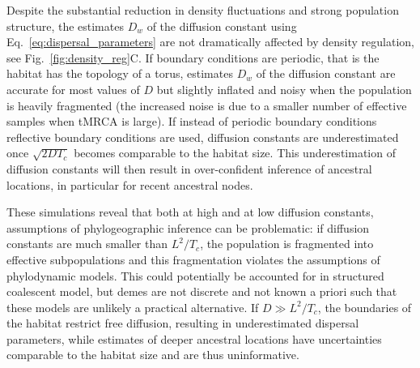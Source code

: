 \documentclass[aps,rmp, twocolumn]{revtex4}
\begin{document}
Despite the substantial reduction in density fluctuations and strong population structure, the estimates $D_w$ of the diffusion constant using Eq.~\ref{eq:dispersal_parameters} are not dramatically affected by density regulation, see Fig.~\ref{fig:density_reg}C.
If boundary conditions are periodic, that is the habitat has the topology of a torus, estimates $D_w$ of the diffusion constant are accurate for most values of $D$ but slightly inflated and noisy  when the population is heavily fragmented (the increased noise is due to a smaller number of effective samples when tMRCA is large).
If instead of periodic boundary conditions reflective boundary conditions are used, diffusion constants are underestimated once $\sqrt{2DT_c}$ becomes comparable to the habitat size.
This underestimation of diffusion constants will then result in over-confident inference of ancestral locations, in particular for recent ancestral nodes.

These simulations reveal that both at high and at low diffusion constants, assumptions of phylogeographic inference can be problematic: if diffusion constants are much smaller than $L^2/T_{c}$, the population is fragmented into effective subpopulations and this fragmentation violates the assumptions of phylodynamic models.
This could potentially be accounted for in structured coalescent model, but demes are not discrete and not known a priori such that these models are unlikely a practical alternative.
If $D\gg L^2/T_{c}$, the boundaries of the habitat restrict free diffusion, resulting in underestimated dispersal parameters, while estimates of deeper ancestral locations have uncertainties comparable to the habitat size and are thus uninformative.
\end{document}
